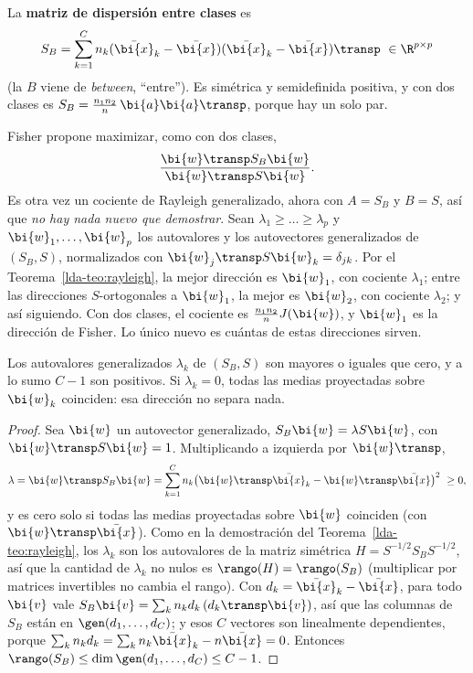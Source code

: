 \begin{definition}\label{lda-def:SB}
La \textbf{matriz de dispersión entre clases} es
\[
S_B=\sum_{k=1}^Cn_k(\bar{\bi{x}}_k-\bar{\bi{x}})(\bar{\bi{x}}_k-\bar{\bi{x}})\transp\ \in\R^{p\times p}
\]
(la $B$ viene de \emph{between}, ``entre''). Es simétrica y semidefinida
positiva, y con dos clases es $S_B=\frac{n_1n_2}{n}\,\bi{a}\bi{a}\transp$, porque hay un
solo par.
\end{definition}

Fisher propone maximizar, como con dos clases,
\[
\frac{\bi{w}\transp S_B\bi{w}}{\bi{w}\transp S\bi{w}}.
\]
Es otra vez un cociente de Rayleigh generalizado, ahora con $A=S_B$ y $B=S$,
así que \emph{no hay nada nuevo que demostrar}. Sean
$\lambda_1\ge\dots\ge\lambda_p$ y $\bi{w}_1,\dots,\bi{w}_p$ los autovalores y los
autovectores generalizados de $(S_B,S)$, normalizados con
$\bi{w}_j\transp S\bi{w}_k=\delta_{jk}$. Por el Teorema~\ref{lda-teo:rayleigh}, la mejor
dirección es $\bi{w}_1$, con cociente $\lambda_1$; entre las direcciones
$S$-ortogonales a $\bi{w}_1$, la mejor es $\bi{w}_2$, con cociente $\lambda_2$; y así
siguiendo. Con dos clases, el cociente es $\frac{n_1n_2}{n}J(\bi{w})$, y $\bi{w}_1$ es
la dirección de Fisher. Lo único nuevo es cuántas de estas direcciones sirven.

\begin{proposition}\label{lda-prop:multi}
Los autovalores generalizados $\lambda_k$ de $(S_B,S)$ son mayores o iguales
que cero, y a lo sumo $C-1$ son positivos. Si $\lambda_k=0$, todas las medias
proyectadas sobre $\bi{w}_k$ coinciden: esa dirección no separa nada.
\end{proposition}

\begin{proof}
Sea $\bi{w}$ un autovector generalizado, $S_B\bi{w}=\lambda S\bi{w}$, con $\bi{w}\transp S\bi{w}=1$.
Multiplicando a izquierda por $\bi{w}\transp$,
\[
\lambda=\bi{w}\transp S_B\bi{w}=\sum_{k=1}^Cn_k\bigl(\bi{w}\transp\bar{\bi{x}}_k-\bi{w}\transp\bar{\bi{x}}\bigr)^2\ \ge0 ,
\]
y es cero solo si todas las medias proyectadas sobre $\bi{w}$ coinciden (con
$\bi{w}\transp\bar{\bi{x}}$). Como en la demostración del Teorema~\ref{lda-teo:rayleigh},
los $\lambda_k$ son los autovalores de la matriz simétrica
$H=S^{-1/2}S_BS^{-1/2}$, así que la cantidad de $\lambda_k$ no nulos es
$\rango(H)=\rango(S_B)$ (multiplicar por matrices invertibles no cambia el
rango). Con $d_k=\bar{\bi{x}}_k-\bar{\bi{x}}$, para todo $\bi{v}$ vale
$S_B\bi{v}=\sum_kn_kd_k\,(d_k\transp \bi{v})$, así que las columnas de $S_B$ están en
$\gen(d_1,\dots,d_C)$; y esos $C$ vectores son linealmente dependientes,
porque $\sum_kn_kd_k=\sum_kn_k\bar{\bi{x}}_k-n\bar{\bi{x}}=0$. Entonces
$\rango(S_B)\le\dim\gen(d_1,\dots,d_C)\le C-1$.
\end{proof}

